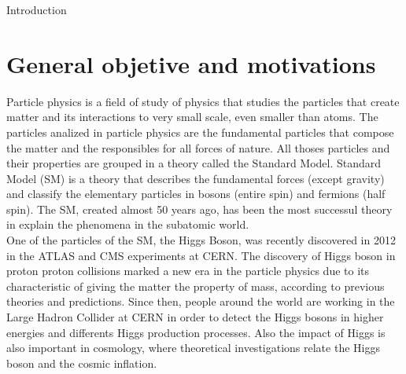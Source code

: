 \renewcommand{\baselinestretch}{1.5}
\nocite{*}
\begin{chapter}{Introduction}

\section{General objetive and motivations}

Particle physics is a field of study of physics that studies the particles that create matter and its interactions to very small scale, even smaller than atoms. The particles analized in particle physics are the fundamental particles that compose the matter and the responsibles for all forces of nature. All thoses particles and their properties are grouped in a theory called the Standard Model. Standard Model (SM) is a theory that describes the fundamental forces (except gravity) and classify the elementary particles in bosons (entire spin) and fermions (half spin).
The SM, created almost 50 years ago, has been the most successul theory in explain the phenomena in the subatomic world.
\\

One of the particles of the SM, the Higgs Boson, was recently discovered in 2012 in the ATLAS and CMS experiments at CERN. The discovery of Higgs boson in proton proton collisions marked a new era in the particle physics due to its characteristic of giving the matter the property of mass, according to previous theories and predictions. Since then, people around the world are working in the Large Hadron Collider at CERN in order to detect the Higgs bosons in higher energies and differents Higgs production processes. 
Also the impact of Higgs is also important in cosmology, where theoretical investigations relate the Higgs boson and the cosmic inflation.\\


\end{chapter}
